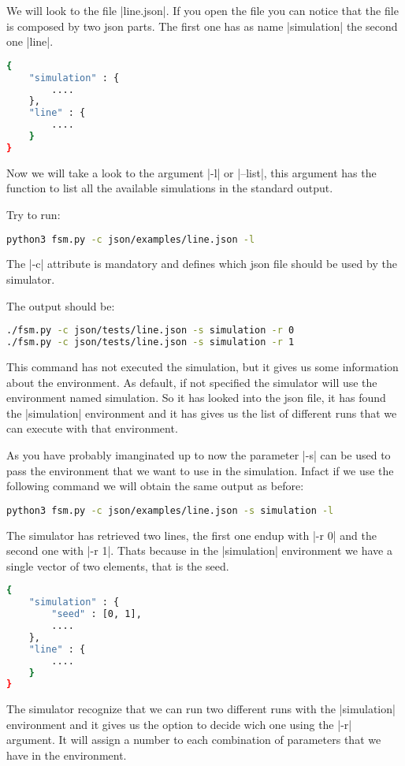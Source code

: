 \documentclass[10pt,journal,onecolumn]{IEEEtran}
\begin{document}
We will look to the file |line.json|.
If you open the file you can notice that the file is composed by two json parts.
The first one has as name |simulation| the second one |line|.

\begin{lstlisting}[language=bash]
{
	"simulation" : {
		....
	},
	"line" : {
		....
	}
}
\end{lstlisting}

Now we will take a look to the argument |-l| or |--list|, this argument has
the function to list all the available simulations in the standard output.

Try to run:
\begin{lstlisting}[language=bash]
	python3 fsm.py -c json/examples/line.json -l
\end{lstlisting}

The |-c| attribute is mandatory and defines which json file should be used by the
simulator.

The output should be:
\begin{lstlisting}[language=bash]
./fsm.py -c json/tests/line.json -s simulation -r 0
./fsm.py -c json/tests/line.json -s simulation -r 1	
\end{lstlisting}

This command has not executed the simulation, but it gives us some information
about the environment.
As default, if not specified the simulator will use the environment named 
simulation.
So it has looked into the json file, it has found the |simulation| environment
and it has gives us the list of different runs that we can execute with that
environment.

As you have probably imanginated up to now the parameter |-s| can be used
to pass the environment that we want to use in the simulation.
Infact if we use the following command we will obtain the same output as before:

\begin{lstlisting}[language=bash]
	python3 fsm.py -c json/examples/line.json -s simulation -l
\end{lstlisting}

The simulator has retrieved two lines, the first one endup with |-r 0| and the
second one with |-r 1|.
Thats because in the |simulation| environment we have a single vector of two 
elements, that is the seed.
\begin{lstlisting}[language=bash]
{
	"simulation" : {
		"seed" : [0, 1],
		....
	},
	"line" : {
		....
	}
}
\end{lstlisting}
The simulator recognize that we can run two different runs with the |simulation|
environment and it gives us the option to decide wich one using the |-r| argument.
It will assign a number to each combination of parameters that we have in
the environment.
\end{document}
